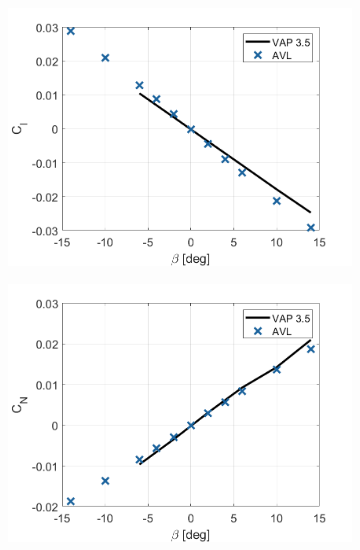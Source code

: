 \begin{figure}[H]
     \centering
     \begin{subfigure}[b]{0.45\textwidth}
            \centering
         \includegraphics[width=\textwidth]{05_Results/Figs/VAP/genMAV/GenMAVModelValidation2.png}
         \label{fig:genMAV_Cl_roll}
         \caption{}

     \end{subfigure}
     \hfill
     \begin{subfigure}[b]{0.45\textwidth}
               \centering
         \includegraphics[width=\textwidth]{05_Results/Figs/VAP/genMAV/GenMAVModelValidation3.png}
         \label{fig:genMAV_Cn}
         \caption{}
     \end{subfigure}
     \hfill
\end{figure}



